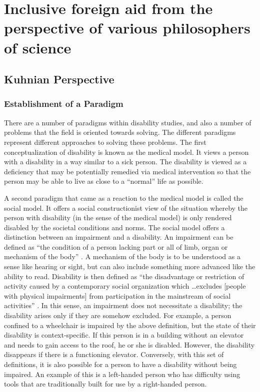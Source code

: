 \documentclass[a4paper]{article}
\begin{document}
\newpage
\section{Inclusive foreign aid from the perspective of various philosophers of
science}

\subsection{Kuhnian Perspective}

\subsubsection{Establishment of a Paradigm}
\label{models}

There are a number of paradigms within disability studies, and also a number
of problems that the field is oriented towards solving. The different
paradigms represent different approaches to solving these problems. The first
conceptualization of disability is known as the medical model. It views a
person with a disability in a way similar to a sick person. The disability is
viewed as a deficiency that may be potentially remedied via medical
intervention so that the person may be able to live as close to a ``normal''
life as possible. 

A second paradigm that came as a reaction to the medical model is called the
social model. It offers a social constructionist view of the situation whereby
the person with disability (in the sense of the medical model) is only rendered
disabled by the societal conditions and norms. The social model offers a
distinction between an impairment and a disability. An impairment can be
defined as ``the condition of a person lacking part or all of limb, organ or
mechanism of the body'' \citep{winter2003development}. A mechanism of the body
is to be understood as a sense like hearing or sight, but can also include
something more advanced like the ability to read. Disability is then defined as
``the disadvantage or restriction of activity caused by a contemporary social
organization which \ldots excludes [people with physical impairments] from
participation in the mainstream of social activities''
\citep{winter2003development}. In this sense, an impairment does not
necessitate a disability; the disability arises only if they are somehow
excluded. For example, a person confined to a wheelchair is impaired by the
above definition, but the state of their disability is context-specific.  If
this person is in a building without an elevator and needs to gain access to
the roof, he or she is disabled. However, the disability disappears if there is
a functioning elevator. Conversely, with this set of definitions, it is also
possible for a person to have a disability without being impaired. An example
of this is a left-handed person who has difficulty using tools that are
traditionally built for use by a right-handed person.
\end{document}
